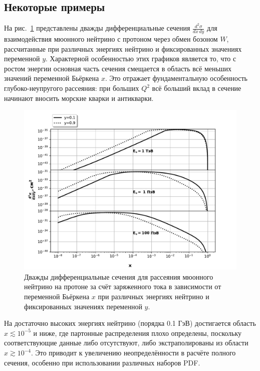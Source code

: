 \subsection{Некоторые примеры}

На рис.~\ref{fig:xsec_2d} представлены дважды дифференциальные сечения $\frac{d^2\sigma}{dx\,dy}$ для взаимодействия мюонного нейтрино с протоном через обмен бозоном $W$, рассчитанные при различных энергиях нейтрино и фиксированных значениях переменной $y$. Характерной особенностью этих графиков является то, что с ростом энергии основная часть сечения смещается в область всё меньших значений переменной Бьёркена $x$. Это отражает фундаментальную особенность глубоко-неупругого рассеяния: при больших $Q^2$ всё больший вклад в сечение начинают вносить морские кварки и антикварки.

\begin{figure}[!h]
\centering
\includegraphics[width=\linewidth]{images/NuProp/xs_vs_xCT18ZNNLO_cc_12_proton.pdf}
\caption{Дважды дифференциальные сечения для рассеяния мюонного нейтрино на протоне за счёт заряженного тока в зависимости от переменной Бьёркена $x$ при различных энергиях нейтрино и фиксированных значениях переменной $y$.}
\label{fig:xsec_2d}
\end{figure}

На достаточно высоких энергиях нейтрино (порядка 0.1 ГэВ) достигается область $x \lesssim 10^{-5}$ и ниже, где партонные распределения плохо определены, поскольку соответствующие данные либо отсутствуют, либо экстраполированы из области $x \gtrsim 10^{-4}$. Это приводит к увеличению неопределённости в расчёте полного сечения, особенно при использовании различных наборов PDF.


